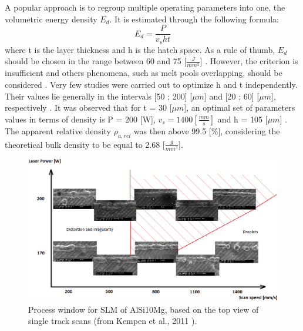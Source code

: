 A popular approach is to regroup multiple operating parameters into one, the volumetric energy density $E_d$. It is estimated through the following formula: 
$$E_d=\frac{P}{v_s h t} $$
where t is the layer thickness and h is the hatch space. As a rule of thumb, $E_d$ should be chosen in the range between 60 and 75 [$\frac{J}{mm^3}$] \parencite{Read150417}. However, the criterion is insufficient and others phenomena, such as melt pools overlapping, should be considered \parencite{Tang170309}. Very few studies were carried out to optimize h and t independently. Their values lie generally in the intervals [50 ; 200] [$\mu m$] and [20 ; 60] [$\mu m$], respectively \parencite{aboulkhair2016,Brandl121509,Kempen110817,Mertens170406}. It was observed that for t = 30 [$\mu m$], an optimal set of parameters values in terms of density is P = 200 [W], $v_s=1400 [\frac{mm}{s}]$ and h = 105 [$\mu m$] \parencite{Kempen110817}. The apparent relative density $\rho_{a,rel}$ was then above 99.5 [\%], considering the theoretical bulk density to be equal to 2.68 [$\frac{g}{mm^3}$].\\

\begin{figure}[ht]
\centering
\includegraphics[scale=0.34]{Images/Pvs}
\decoRule
\caption[Process window for SLM of AlSi10Mg, based on the top view of single track scans]{Process window for SLM of AlSi10Mg, based on the top view of single track scans (from Kempen et al., 2011 \parencite{Kempen110817}).}
\label{fig:Pvs}
\end{figure}

